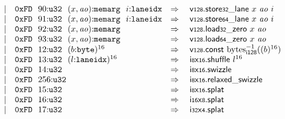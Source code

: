 $$\begin{array}[t]{@{}lrrl@{}l@{}l@{}l@{}}
& & | & \mathtt{0xFD}~~90{:}{\mathtt{u32}}~~(x, {\mathit{ao}}){:}{\mathtt{memarg}}~~i{:}{\mathtt{laneidx}} & \quad\Rightarrow\quad{} & {\mathsf{v{\scriptstyle 128}}{.}\mathsf{store}}{\mathsf{{\scriptstyle 32}}}{\mathsf{\_}}{\mathsf{lane}}~x~{\mathit{ao}}~i \\
& & | & \mathtt{0xFD}~~91{:}{\mathtt{u32}}~~(x, {\mathit{ao}}){:}{\mathtt{memarg}}~~i{:}{\mathtt{laneidx}} & \quad\Rightarrow\quad{} & {\mathsf{v{\scriptstyle 128}}{.}\mathsf{store}}{\mathsf{{\scriptstyle 64}}}{\mathsf{\_}}{\mathsf{lane}}~x~{\mathit{ao}}~i \\
& & | & \mathtt{0xFD}~~92{:}{\mathtt{u32}}~~(x, {\mathit{ao}}){:}{\mathtt{memarg}} & \quad\Rightarrow\quad{} & {\mathsf{v{\scriptstyle 128}}{.}\mathsf{load}}{{\mathsf{{\scriptstyle 32}}}{\mathsf{\_}}{\mathsf{zero}}}~x~{\mathit{ao}} \\
& & | & \mathtt{0xFD}~~93{:}{\mathtt{u32}}~~(x, {\mathit{ao}}){:}{\mathtt{memarg}} & \quad\Rightarrow\quad{} & {\mathsf{v{\scriptstyle 128}}{.}\mathsf{load}}{{\mathsf{{\scriptstyle 64}}}{\mathsf{\_}}{\mathsf{zero}}}~x~{\mathit{ao}} \\
& & | & \mathtt{0xFD}~~12{:}{\mathtt{u32}}~~{(b{:}{\mathtt{byte}})^{16}} & \quad\Rightarrow\quad{} & \mathsf{v{\scriptstyle 128}}{.}\mathsf{const}~{{{{\mathrm{bytes}}}_{{\mathsf{i}}{\mathsf{{\scriptstyle 128}}}}^{{-1}}}}{({(b)^{16}})} \\
& & | & \mathtt{0xFD}~~13{:}{\mathtt{u32}}~~{(l{:}{\mathtt{laneidx}})^{16}} & \quad\Rightarrow\quad{} & {\mathsf{i{\scriptstyle 8}}}{\mathsf{x}}{\mathsf{{\scriptstyle 16}}}{.}\mathsf{shuffle}~{l^{16}} \\
& & | & \mathtt{0xFD}~~14{:}{\mathtt{u32}} & \quad\Rightarrow\quad{} & {\mathsf{i{\scriptstyle 8}}}{\mathsf{x}}{\mathsf{{\scriptstyle 16}}} {.} \mathsf{swizzle} \\
& & | & \mathtt{0xFD}~~256{:}{\mathtt{u32}} & \quad\Rightarrow\quad{} & {\mathsf{i{\scriptstyle 8}}}{\mathsf{x}}{\mathsf{{\scriptstyle 16}}} {.} \mathsf{relaxed\_swizzle} \\
& & | & \mathtt{0xFD}~~15{:}{\mathtt{u32}} & \quad\Rightarrow\quad{} & {\mathsf{i{\scriptstyle 8}}}{\mathsf{x}}{\mathsf{{\scriptstyle 16}}}{.}\mathsf{splat} \\
& & | & \mathtt{0xFD}~~16{:}{\mathtt{u32}} & \quad\Rightarrow\quad{} & {\mathsf{i{\scriptstyle 16}}}{\mathsf{x}}{\mathsf{{\scriptstyle 8}}}{.}\mathsf{splat} \\
& & | & \mathtt{0xFD}~~17{:}{\mathtt{u32}} & \quad\Rightarrow\quad{} & {\mathsf{i{\scriptstyle 32}}}{\mathsf{x}}{\mathsf{{\scriptstyle 4}}}{.}\mathsf{splat} \\

\end{array}$$
